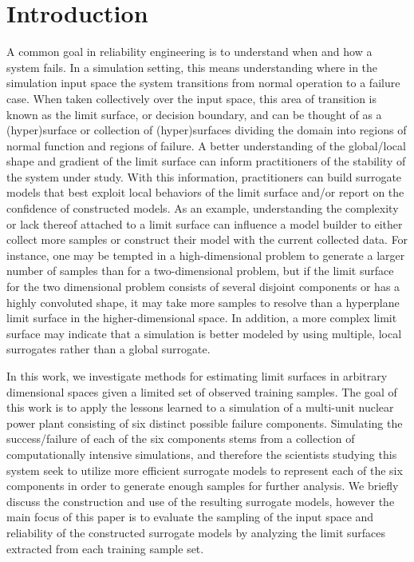 \section{Introduction}
\label{sec:introduction}

A common goal in reliability engineering is to understand when and how a system fails.
%
In a simulation setting, this means understanding where in the simulation input space the system transitions from normal operation to a failure case.
%
When taken collectively over the input space, this area of transition is known as the limit surface, or decision boundary, and can be thought of as a (hyper)surface or collection of (hyper)surfaces dividing the domain into regions of normal function and regions of failure.
%
A better understanding of the global/local shape and gradient of the limit surface can inform practitioners of the stability of the system under study.
%
With this information, practitioners can build surrogate models that best exploit local behaviors of the limit surface and/or report on the confidence of constructed models.
%
As an example, understanding the complexity or lack thereof attached to a limit surface can influence a model builder to either collect more samples or construct their model with the current collected data.
%
For instance, one may be tempted in a high-dimensional problem to generate a larger number of samples than for a two-dimensional problem, but if the limit surface for the two dimensional problem consists of several disjoint components or has a highly convoluted shape, it may take more samples to resolve than a hyperplane limit surface in the higher-dimensional space.
%
In addition, a more complex limit surface may indicate that a simulation is better modeled by using multiple, local surrogates rather than a global surrogate.

In this work, we investigate methods for estimating limit surfaces in arbitrary dimensional spaces given a limited set of observed training samples.
%
The goal of this work is to apply the lessons learned to a simulation of a multi-unit nuclear power plant consisting of six distinct possible failure components.
%
Simulating the success/failure of each of the six components stems from a collection of computationally intensive simulations, and therefore the scientists studying this system seek to utilize more efficient surrogate models to represent each of the six components in order to generate enough samples for further analysis.
%
We briefly discuss the construction and use of the resulting surrogate models, however the main focus of this paper is to evaluate the sampling of the input space and reliability of the constructed surrogate models by analyzing the limit surfaces extracted from each training sample set.


